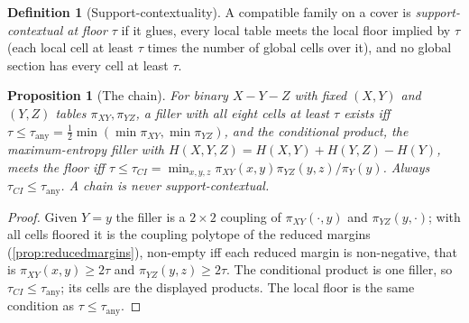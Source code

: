 \documentclass[11pt]{article}
\newtheorem{proposition}[theorem]{Proposition}
\theoremstyle{definition}
\newtheorem{definition}[theorem]{Definition}
\theoremstyle{remark}
\begin{document}
\begin{definition}[Support-contextuality]\label{def:suppctx}
A compatible family on a cover is \emph{support-contextual at floor $\tau$} if it glues, every local table meets the local floor
implied by $\tau$ (each local cell at least $\tau$ times the number of global cells over it), and no global section has every cell
at least $\tau$.
\end{definition}

\begin{proposition}[The chain]\label{prop:floorchain}
For binary $X-Y-Z$ with fixed $(X,Y)$ and $(Y,Z)$ tables $\pi_{XY},\pi_{YZ}$, a filler with all eight cells at least $\tau$ exists iff
$\tau\le\tau_{\mathrm{any}}=\tfrac12\min(\min\pi_{XY},\min\pi_{YZ})$, and the conditional product, the maximum-entropy filler with
$H(X,Y,Z)=H(X,Y)+H(Y,Z)-H(Y)$, meets the floor iff $\tau\le\tau_{CI}=\min_{x,y,z}\pi_{XY}(x,y)\pi_{YZ}(y,z)/\pi_Y(y)$. Always
$\tau_{CI}\le\tau_{\mathrm{any}}$. A chain is never support-contextual.
\end{proposition}
\begin{proof}
Given $Y=y$ the filler is a $2\times2$ coupling of $\pi_{XY}(\cdot,y)$ and $\pi_{YZ}(y,\cdot)$; with all cells floored it is the coupling
polytope of the reduced margins (\cref{prop:reducedmargins}), non-empty iff each reduced margin is non-negative, that is
$\pi_{XY}(x,y)\ge2\tau$ and $\pi_{YZ}(y,z)\ge2\tau$. The conditional product is one filler, so $\tau_{CI}\le\tau_{\mathrm{any}}$; its
cells are the displayed products. The local floor is the same condition as $\tau\le\tau_{\mathrm{any}}$.
\end{proof}
\end{document}
